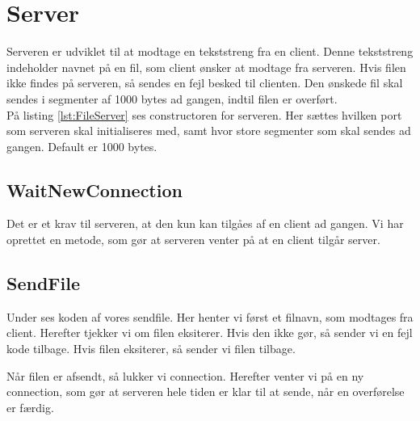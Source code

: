 \section{Server}

Serveren er udviklet til at modtage en tekststreng fra en client. Denne tekststreng indeholder navnet på en fil, som client ønsker at modtage fra serveren. Hvis filen ikke findes på serveren, så sendes en fejl besked til clienten.
Den ønskede fil skal sendes i segmenter af 1000 bytes ad gangen, indtil filen er overført. \\

På listing \ref{lst:FileServer} ses constructoren for serveren. Her sættes hvilken port som serveren skal initialiseres med, samt hvor store segmenter som skal sendes ad gangen. Default er 1000 bytes. 



\subsection{WaitNewConnection}

Det er et krav til serveren, at den kun kan tilgåes af en client ad gangen. Vi har oprettet en metode, som gør at serveren venter på at en client tilgår server. 



\subsection{SendFile}

Under ses koden af vores sendfile. Her henter vi først et filnavn, som modtages fra client. Herefter tjekker vi om filen eksiterer. Hvis den ikke gør, så sender vi en fejl kode tilbage.
Hvis filen eksiterer, så sender vi filen tilbage. 

Når filen er afsendt, så lukker vi connection. Herefter venter vi på en ny connection, som gør at serveren hele tiden er klar til at sende, når en overførelse er færdig. 



